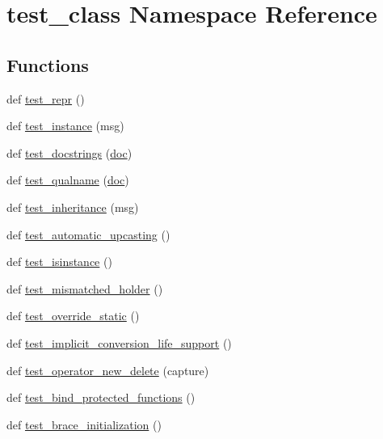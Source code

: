 \hypertarget{namespacetest__class}{}\section{test\+\_\+class Namespace Reference}
\label{namespacetest__class}
\subsection*{Functions}
\begin{DoxyCompactItemize}
\item 
def \mbox{\hyperlink{namespacetest__class_a206c8002ac513ddb5785894b09972933}{test\+\_\+repr}} ()
\item 
def \mbox{\hyperlink{namespacetest__class_a1b8c06816f8a2343a4beb4379d529839}{test\+\_\+instance}} (msg)
\item 
def \mbox{\hyperlink{namespacetest__class_a04aae4cc13e0bccea0bf6b83429a24b3}{test\+\_\+docstrings}} (\mbox{\hyperlink{structdoc}{doc}})
\item 
def \mbox{\hyperlink{namespacetest__class_ac1d9069399bd0db4b0caed7fd883e025}{test\+\_\+qualname}} (\mbox{\hyperlink{structdoc}{doc}})
\item 
def \mbox{\hyperlink{namespacetest__class_a6ad1d320c0df466ea08032b565ba5ba1}{test\+\_\+inheritance}} (msg)
\item 
def \mbox{\hyperlink{namespacetest__class_ac62eac725c22058ddc5bde8458eaf68c}{test\+\_\+automatic\+\_\+upcasting}} ()
\item 
def \mbox{\hyperlink{namespacetest__class_aefb1f40cbb5251b4542470204d44ffa6}{test\+\_\+isinstance}} ()
\item 
def \mbox{\hyperlink{namespacetest__class_af11c9077874fa2e1cd7ded50f8c4d515}{test\+\_\+mismatched\+\_\+holder}} ()
\item 
def \mbox{\hyperlink{namespacetest__class_a8335b78a7a5a1b496f2eaea9f8cf1336}{test\+\_\+override\+\_\+static}} ()
\item 
def \mbox{\hyperlink{namespacetest__class_a9b105e0e35185b07ffcb69eec1b68d69}{test\+\_\+implicit\+\_\+conversion\+\_\+life\+\_\+support}} ()
\item 
def \mbox{\hyperlink{namespacetest__class_a5aa0b7714fa04082b305b40aca08d29f}{test\+\_\+operator\+\_\+new\+\_\+delete}} (capture)
\item 
def \mbox{\hyperlink{namespacetest__class_a89e248bef059bdbbcb145489a0701cb3}{test\+\_\+bind\+\_\+protected\+\_\+functions}} ()
\item 
def \mbox{\hyperlink{namespacetest__class_a9a98e8e231afaed5c685e02907f8353d}{test\+\_\+brace\+\_\+initialization}} ()

\end{DoxyCompactItemize}
